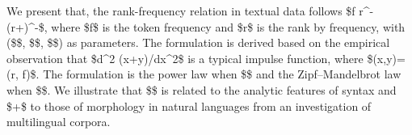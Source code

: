 We present that, the rank-frequency relation in textual data follows \$f \propto r^{-\alpha}(r+\gamma)^{-\beta}\$, where \$f\$ is the token frequency and \$r\$ is the rank by frequency, with (\$\alpha\$, \$\beta\$, \$\gamma\$) as parameters. The formulation is derived based on the empirical observation that \$d^2 (x+y)/dx^2\$ is a typical impulse function, where \$(x,y)=(\log r, \log f)\$. The formulation is the power law when \mbox{\$\$} and the Zipf--Mandelbrot law when \mbox{\$\$}. We illustrate that \$\alpha\$ is related to the analytic features of syntax and \$\beta+\gamma\$ to those of morphology in natural languages from an investigation of multilingual corpora.
